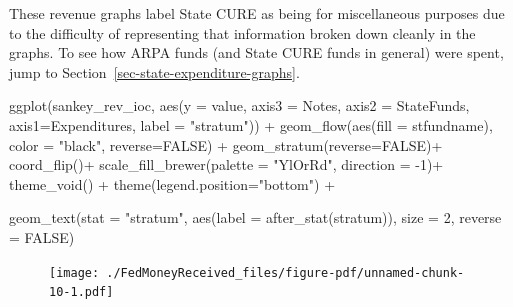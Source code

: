 \documentclass[
  letterpaper,
  DIV=11,
  numbers=noendperiod]{scrreport}
\newenvironment{Shaded}{\begin{snugshade}}{\end{snugshade}}
\newcommand{\AttributeTok}[1]{\textcolor[rgb]{0.40,0.45,0.13}{#1}}
\newcommand{\ConstantTok}[1]{\textcolor[rgb]{0.56,0.35,0.01}{#1}}
\newcommand{\DecValTok}[1]{\textcolor[rgb]{0.68,0.00,0.00}{#1}}
\newcommand{\FunctionTok}[1]{\textcolor[rgb]{0.28,0.35,0.67}{#1}}
\newcommand{\NormalTok}[1]{\textcolor[rgb]{0.00,0.23,0.31}{#1}}
\newcommand{\SpecialCharTok}[1]{\textcolor[rgb]{0.37,0.37,0.37}{#1}}
\newcommand{\StringTok}[1]{\textcolor[rgb]{0.13,0.47,0.30}{#1}}
\begin{document}
These revenue graphs label State CURE as being for miscellaneous
purposes due to the difficulty of representing that information broken
down cleanly in the graphs. To see how ARPA funds (and State CURE funds
in general) were spent, jump to
Section~\ref{sec-state-expenditure-graphs}.

\begin{Shaded}
\begin{Highlighting}[]
\FunctionTok{ggplot}\NormalTok{(sankey\_rev\_ioc, }
       \FunctionTok{aes}\NormalTok{(}\AttributeTok{y =}\NormalTok{ value, }
           \AttributeTok{axis3 =}\NormalTok{ Notes, }\AttributeTok{axis2 =}\NormalTok{ StateFunds, }\AttributeTok{axis1=}\NormalTok{Expenditures, }\AttributeTok{label =} \StringTok{"stratum"}\NormalTok{)) }\SpecialCharTok{+}
  \FunctionTok{geom\_flow}\NormalTok{(}\FunctionTok{aes}\NormalTok{(}\AttributeTok{fill =}\NormalTok{ stfundname), }\AttributeTok{color =} \StringTok{"black"}\NormalTok{, }\AttributeTok{reverse=}\ConstantTok{FALSE}\NormalTok{) }\SpecialCharTok{+}
  \FunctionTok{geom\_stratum}\NormalTok{(}\AttributeTok{reverse=}\ConstantTok{FALSE}\NormalTok{)}\SpecialCharTok{+}
\FunctionTok{coord\_flip}\NormalTok{()}\SpecialCharTok{+}
   \FunctionTok{scale\_fill\_brewer}\NormalTok{(}\AttributeTok{palette =} \StringTok{"YlOrRd"}\NormalTok{, }\AttributeTok{direction =} \SpecialCharTok{{-}}\DecValTok{1}\NormalTok{)}\SpecialCharTok{+}
  \FunctionTok{theme\_void}\NormalTok{() }\SpecialCharTok{+}
  \FunctionTok{theme}\NormalTok{(}\AttributeTok{legend.position=}\StringTok{"bottom"}\NormalTok{) }\SpecialCharTok{+}

      \FunctionTok{geom\_text}\NormalTok{(}\AttributeTok{stat =} \StringTok{"stratum"}\NormalTok{, }\FunctionTok{aes}\NormalTok{(}\AttributeTok{label =} \FunctionTok{after\_stat}\NormalTok{(stratum)), }\AttributeTok{size =} \DecValTok{2}\NormalTok{, }\AttributeTok{reverse =} \ConstantTok{FALSE}\NormalTok{)}
\end{Highlighting}
\end{Shaded}

\begin{figure}[H]

{\centering \texttt{[image: ./FedMoneyReceived\_files/figure-pdf/unnamed-chunk-10-1.pdf]}

}

\end{figure}
\end{document}

